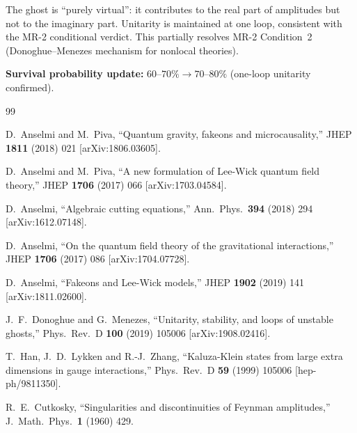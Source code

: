 \documentclass[11pt,a4paper]{article}
\begin{document}
The ghost is ``purely virtual'': it contributes to the real part of amplitudes
but not to the imaginary part.  Unitarity is maintained at one loop, consistent
with the MR-2 conditional verdict.  This partially resolves MR-2 Condition~2
(Donoghue--Menezes mechanism for nonlocal theories).

\medskip
\noindent\textbf{Survival probability update:}
$60\text{--}70\% \to 70\text{--}80\%$ (one-loop unitarity confirmed).


\begin{thebibliography}{99}

  D.~Anselmi and M.~Piva,
  ``Quantum gravity, fakeons and microcausality,''
  JHEP \textbf{1811} (2018) 021
  [arXiv:1806.03605].

  D.~Anselmi and M.~Piva,
  ``A new formulation of Lee-Wick quantum field theory,''
  JHEP \textbf{1706} (2017) 066
  [arXiv:1703.04584].

  D.~Anselmi,
  ``Algebraic cutting equations,''
  Ann.\ Phys.\ \textbf{394} (2018) 294
  [arXiv:1612.07148].

  D.~Anselmi,
  ``On the quantum field theory of the gravitational interactions,''
  JHEP \textbf{1706} (2017) 086
  [arXiv:1704.07728].

  D.~Anselmi,
  ``Fakeons and Lee-Wick models,''
  JHEP \textbf{1902} (2019) 141
  [arXiv:1811.02600].

  J.~F.~Donoghue and G.~Menezes,
  ``Unitarity, stability, and loops of unstable ghosts,''
  Phys.\ Rev.\ D \textbf{100} (2019) 105006
  [arXiv:1908.02416].

  T.~Han, J.~D.~Lykken and R.-J.~Zhang,
  ``Kaluza-Klein states from large extra dimensions in gauge interactions,''
  Phys.\ Rev.\ D \textbf{59} (1999) 105006
  [hep-ph/9811350].

  R.~E.~Cutkosky,
  ``Singularities and discontinuities of Feynman amplitudes,''
  J.\ Math.\ Phys.\ \textbf{1} (1960) 429.

\end{thebibliography}
\end{document}
